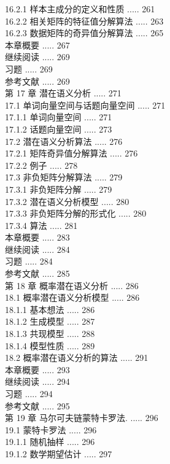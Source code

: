 \documentclass[10pt]{article}
\begin{document}
\begin{CJK*}{UTF8}{bsmi}
16.2.1 样本主成分的定义和性质 ..... 261\\
16.2.2 相关矩阵的特征值分解算法 ..... 263\\
16.2.3 数据矩阵的奇异值分解算法 ..... 265\\
本章概要 ..... 267\\
继续阅读 ..... 269\\
习题 ..... 269\\
参考文献 ..... 269\\
第 17 章 潜在语义分析 ..... 271\\
17.1 单词向量空间与话题向量空间 ..... 271\\
17.1.1 单词向量空间 ..... 271\\
17.1.2 话题向量空间 ..... 273\\
17.2 潜在语义分析算法 ..... 276\\
17.2.1 矩阵奇异值分解算法 ..... 276\\
17.2.2 例子 ..... 278\\
17.3 非负矩阵分解算法 ..... 279\\
17.3.1 非负矩阵分解 ..... 279\\
17.3.2 潜在语义分析模型 ..... 280\\
17.3.3 非负矩阵分解的形式化 ..... 280\\
17.3.4 算法 ..... 281\\
本章概要 ..... 283\\
继续阅读 ..... 284\\
习题 ..... 284\\
参考文献 ..... 285\\
第 18 章 概率潜在语义分析 ..... 286\\
18.1 概率潜在语义分析模型 ..... 286\\
18.1.1 基本想法 ..... 286\\
18.1.2 生成模型 ..... 287\\
18.1.3 共现模型 ..... 288\\
18.1.4 模型性质 ..... 289\\
18.2 概率潜在语义分析的算法 ..... 291\\
本章概要 ..... 293\\
继续阅读 ..... 294\\
习题 ..... 294\\
参考文献 ..... 295\\
第 19 章 马尔可夫链蒙特卡罗法. ..... 296\\
19.1 蒙特卡罗法 ..... 296\\
19.1.1 随机抽样 ..... 296\\
19.1.2 数学期望估计 ..... 297\\

\end{CJK*}
\end{document}
